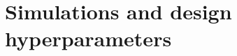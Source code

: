 \documentclass[letterpaper, 12pt, parskip=full,DIV=10]{scrartcl}
\begin{document}
% 
%


\section{Simulations and design hyperparameters}\label{simulations}
\end{document}
